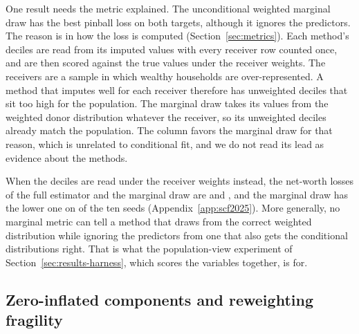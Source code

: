 One result needs the metric explained. The unconditional weighted
marginal draw has the best pinball loss on both targets, although it ignores
the predictors. The reason is in how the loss is computed
(Section~\ref{sec:metrics}). Each method's deciles are read from its imputed
values with every receiver row counted once, and are then scored against the
true values under the receiver weights. The receivers are a sample in which
wealthy households are over-represented. A method that imputes well for each
receiver therefore has unweighted deciles that sit too high for the
population. The marginal draw takes its values from the weighted donor
distribution whatever the receiver, so its unweighted deciles already match
the population. The column favors the marginal draw for that reason, which
is unrelated to conditional fit, and we do not read its lead as evidence
about the methods.

When the deciles are read under the receiver weights instead, the net-worth
losses of the full estimator and the marginal draw are
 and
, and the marginal draw has the
lower one on  of the ten
seeds (Appendix~\ref{app:scf2025}). More generally, no marginal metric can
tell a method that draws from the correct weighted distribution while
ignoring the predictors from one that also gets the conditional
distributions right. That is what the population-view experiment of
Section~\ref{sec:results-harness}, which scores the variables together, is
for.

\subsection{Zero-inflated components and reweighting fragility}
\label{sec:results-cps}


